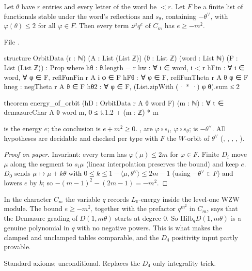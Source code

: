\begin{theorem}\label{l25:thm:energy}
Let $\theta$ have $r$ entries and every letter of the word be $<r$. Let $F$ be a finite list of functionals stable under
the word's reflections and $s_\theta$, containing $-\theta^\vee$, with
$\varphi(\theta)\le2$ for all $\varphi\in F$. Then every term $z^\mu q^e$ of $C_m$ has $e\ge-m^2$.
\end{theorem}
\noindent File .
\begin{leancode}
structure OrbitData (r : ℕ) (A : List (List ℤ)) (θ : List ℤ) (word : List ℕ) (F : List (List ℤ)) :
    Prop where
  hθ : θ.length = r
  hw : ∀ i ∈ word, i < r
  hFin : ∀ i ∈ word, ∀ φ ∈ F, reflFunFin r A i φ ∈ F
  hFθ : ∀ φ ∈ F, reflFunTheta r A θ φ ∈ F
  hneg : negTheta r A θ ∈ F
  hθ2 : ∀ φ ∈ F, (List.zipWith (· * ·) φ θ).sum ≤ 2

theorem energy_of_orbit (hD : OrbitData r A θ word F) (m : ℕ) :
    ∀ t ∈ demazureChar A θ word m, 0 ≤ t.1.2 + (m : ℤ) * m
\end{leancode}
\begin{dictionary}
 is the energy $e$; the conclusion is $e+m^2\ge0$. ,  are $\varphi\circ s_i$,
$\varphi\circ s_\theta$;  is $-\theta^\vee$. All hypotheses are decidable and checked per type with $F$ the
$W$-orbit of $\theta^\vee$ (, , ,
, ).
\end{dictionary}
\begin{proof}[Proof on paper]
Invariant: every term has $\varphi(\mu)\le2m$ for $\varphi\in F$. Finite $D_i$ move $\mu$ along the segment to $s_i\mu$
(linear interpolation preserves the bound) and keep $e$. $D_0$ sends $\mu\mapsto\mu+k\theta$ with
$0\le k\le1-\langle\mu,\theta^\vee\rangle\le2m-1$ (using $-\theta^\vee\in F$) and lowers $e$ by $k$; so
$-(m-1)^2-(2m-1)=-m^2$.
\end{proof}
\begin{physics}
In the character $C_m$ the variable $q$ records $L_0$-energy inside the level-one WZW module. The bound $e\ge-m^2$,
together with the prefactor $q^{m^2}$ in $C_m$, says that the Demazure grading of $D(1,m\theta)$ starts at degree $0$. So $\mathrm{Hilb}_qD(1,m\theta)$ is a genuine polynomial in $q$ with no negative powers.
This is what makes the clamped and unclamped tables comparable, and the $D_4$ positivity input partly provable.
\end{physics}
\begin{status}
Standard axioms; unconditional. Replaces the $D_4$-only integrality trick.
\end{status}

